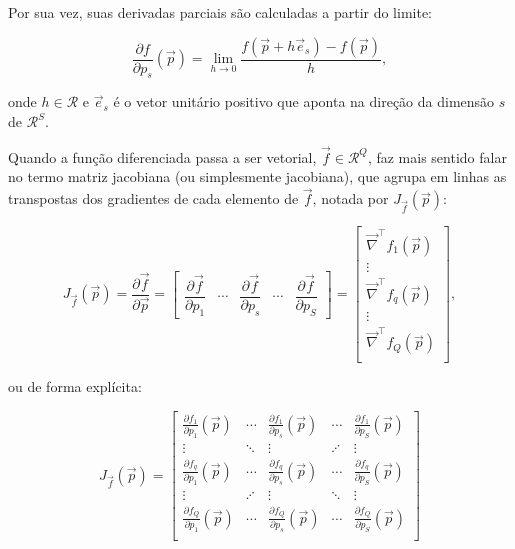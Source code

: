   \noindent Por sua vez, suas derivadas parciais são calculadas a partir do limite:

  \begin{equation} \label{e:parcial_definicao}
    \frac{\partial f}{\partial p_s}(\vec{p}) =
      \lim_{h \to 0} \frac{
        f(\vec{p} + h \vec{e}_s) - f(\vec{p})
      }{h}
      ,
  \end{equation}

  \noindent onde $h \in \mathcal{R}$ e $\vec{e}_s$ é o vetor unitário positivo que aponta na direção da dimensão $s$ de $\mathcal{R}^S$.

  Quando a função diferenciada passa a ser vetorial, $\vec{f} \in \mathcal{R}^Q$, faz mais sentido falar no termo matriz jacobiana (ou simplesmente jacobiana), que agrupa em linhas as transpostas dos gradientes de cada elemento de $\vec{f}$, notada por $J_{\vec{f}}(\vec{p})$:

  \begin{equation} \label{e:del_definicao}
    J_{\vec{f}}(\vec{p}) =
      \dfrac{\partial \vec{f}}{\partial\vec{p}} =
      \begin{bmatrix}
        \dfrac{\partial \vec{f}}{\partial p_1} & \cdots & \dfrac{\partial \vec{f}}{\partial p_s} & \cdots & \dfrac{\partial \vec{f}}{\partial p_S}
      \end{bmatrix} =
      \begin{bmatrix}
        \vec{\nabla}^\top f_1(\vec{p}) \\
        \vdots \\
        \vec{\nabla}^\top f_q(\vec{p}) \\
        \vdots \\
        \vec{\nabla}^\top f_Q(\vec{p}) \\
      \end{bmatrix}
      ,
  \end{equation}

  \noindent ou de forma explícita:

    \begin{equation} \label{e:jacobiana_definicao_explicita}
      J_{\vec{f}}(\vec{p}) =
      \begin{bmatrix}
        \frac{\partial f_1}{\partial p_1}(\vec{p}) & \cdots & \frac{\partial f_1}{\partial p_s}(\vec{p}) & \cdots & \frac{\partial f_1}{\partial p_S}(\vec{p}) \\
        \vdots& \ddots& \vdots &\iddots &\vdots  \\
        \frac{\partial f_q}{\partial p_1}(\vec{p}) & \cdots & \frac{\partial f_q}{\partial p_s}(\vec{p}) & \cdots & \frac{\partial f_q}{\partial p_S}(\vec{p}) \\
        \vdots& \iddots& \vdots &\ddots &\vdots  \\
        \frac{\partial f_Q}{\partial p_1}(\vec{p}) & \cdots & \frac{\partial f_Q}{\partial p_s}(\vec{p}) & \cdots & \frac{\partial f_Q}{\partial p_S}(\vec{p}) \\
      \end{bmatrix}
    \end{equation}


